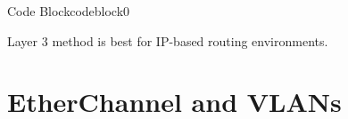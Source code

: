 \documentclass[a4paper]{article}
\begin{document}
\begin{enumerate}

	      \begin{ocg}{Code Block}{codeblock}{0}

		      \vspace{0.5cm}

		      \begin{tcolorbox}
			      Layer 3 method is best for IP-based routing environments.
		      \end{tcolorbox}
		      \vspace{0.5cm}
	      \end{ocg}


\end{enumerate}

\section{EtherChannel and VLANs}
\end{document}
